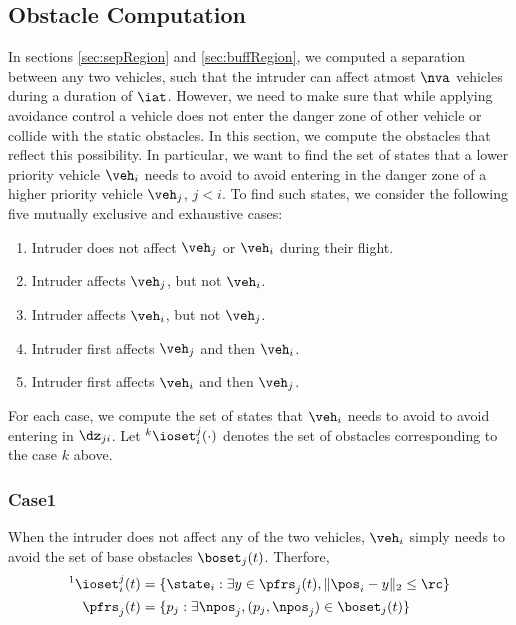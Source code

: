 \subsection{Obstacle Computation} \label{sec:intruderObs}
In sections \ref{sec:sepRegion} and \ref{sec:buffRegion}, we computed a separation between any two vehicles, such that the intruder can affect atmost $\nva$ vehicles during a duration of $\iat$. However, we need to make sure that while applying avoidance control a vehicle does not enter the danger zone of other vehicle or collide with the static obstacles. In this section, we compute the obstacles that reflect this possibility. In particular, we want to find the set of states that a lower priority vehicle $\veh_i$ needs to avoid to avoid entering in the danger zone of a higher priority vehicle $\veh_j$, $j < i$. To find such states, we consider the following five mutually exclusive and exhaustive cases:
\begin{enumerate}
\item Intruder does not affect $\veh_j$ or $\veh_i$ during their flight.
\item Intruder affects $\veh_j$, but not $\veh_i$.
\item Intruder affects $\veh_i$, but not $\veh_j$.
\item Intruder first affects $\veh_j$ and then $\veh_i$.
\item Intruder first affects $\veh_i$ and then $\veh_j$.
\end{enumerate}
For each case, we compute the set of states that $\veh_i$ needs to avoid to avoid entering in $\dz_{ji}$. Let $^k\ioset_i^j(\cdot)$ denotes the set of obstacles corresponding to the case $k$ above. 

\subsubsection{Case1} \label{sec:intruderObs_case1}
When the intruder does not affect any of the two vehicles, $\veh_i$ simply needs to avoid the set of base obstacles $\boset_j(t)$. Therfore, 
\begin{equation} \label{eq:intruderObs_case1}
\begin{aligned}
^1\ioset_i^j(t) & = \{\state_i: \exists y \in \pfrs_j(t), \|\pos_i - y\|_2 \le \rc \}\\
\pfrs_j(t) & = \{p_j: \exists \npos_j, (p_j, \npos_j) \in \boset_j(t) \}
\end{aligned}
\end{equation}


